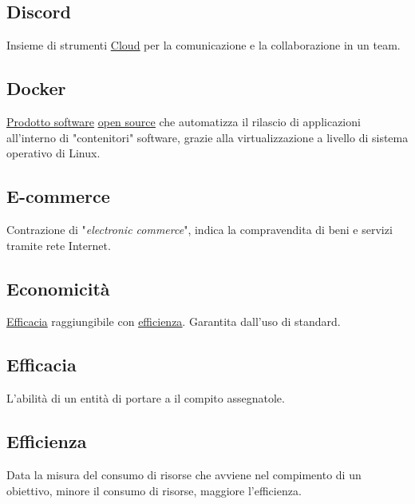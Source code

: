	\subsection{Discord}
	\label{sec:disciplinato}
	Insieme di strumenti \underline{\hyperref[sec:cloud]{Cloud}} per la comunicazione e la collaborazione in un team.

	\subsection{Docker}
	\label{sec:docker}
	\underline{\hyperref[sec:prodottosoftware]{Prodotto software}} \underline{\hyperref[sec:opensource]{open source}} che automatizza il rilascio di applicazioni all'interno di "contenitori" software, grazie alla virtualizzazione a livello di sistema operativo di Linux.



	\subsection{E-commerce}
	\label{sec:ecommerce}
	Contrazione di "\emph{electronic commerce}", indica la compravendita di beni e servizi tramite rete Internet.

	\subsection{Economicità}
	\label{sec:economicita}
	\underline{\hyperref[sec:efficacia]{Efficacia}} raggiungibile con \underline{\hyperref[sec:efficienza]{efficienza}}. Garantita dall'uso di standard.

	\subsection{Efficacia}
	\label{sec:efficacia}
	L'abilità di un entità di portare a il compito assegnatole.

	\subsection{Efficienza}
	\label{sec:efficienza}
	Data la misura del consumo di risorse che avviene nel compimento di un obiettivo, minore il consumo di risorse, maggiore l'efficienza.

